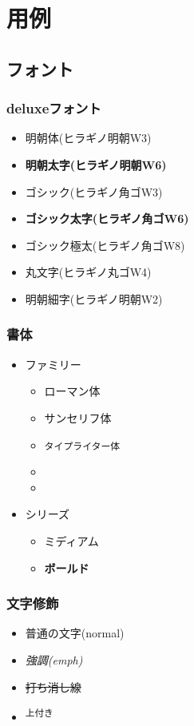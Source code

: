 \section{用例}
\subsection{フォント}

\subsubsection{deluxeフォント}
\begin{itemize}
  \item {\mcfamily 明朝体(ヒラギノ明朝W3)}
  \item {\mcfamily\bfseries 明朝太字(ヒラギノ明朝W6)}
  \item {\gtfamily ゴシック(ヒラギノ角ゴW3)}
  \item {\gtfamily\bfseries ゴシック太字(ヒラギノ角ゴW6)}
  \item {\gtfamily\ebseries ゴシック極太(ヒラギノ角ゴW8)}
  \item {\mgfamily 丸文字(ヒラギノ丸ゴW4)}
  \item {\mcfamily\ltseries 明朝細字(ヒラギノ明朝W2)}
\end{itemize}

\subsubsection{書体}
\begin{itemize}
  \item ファミリー
  \begin{itemize}
    \item \textrm{ローマン体}
    \item \textsf{サンセリフ体}
    \item \texttt{タイプライター体}
    \item {}
    \item {}
  \end{itemize}

  \item シリーズ
  \begin{itemize}
    \item \textmd{ミディアム}
    \item \textbf{ボールド}
  \end{itemize}
\end{itemize}

\subsubsection{文字修飾}
\begin{itemize}
\item 普通の文字(normal)
\item \emph{強調(emph)}
\item \sout{打ち消し線}
\item \textsuperscript{上付き}
\end{itemize}


